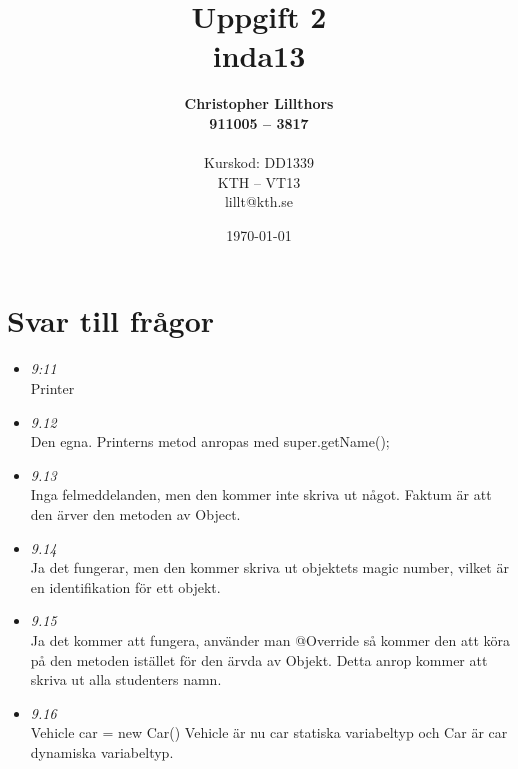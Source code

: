 \documentclass[a4paper,11pt]{article}
\title{Uppgift 2 \\ inda13}
\author{
  {\bf Christopher Lillthors}\\
  \textbf{911005 -- 3817} \\
  \\ 
  Kurskod: DD1339\\
  KTH -- VT13\\
  lillt@kth.se\\
}
\date{\today}
\begin{document}
\maketitle

\renewcommand{\arraystretch}{1.2}
\newpage

\section{Svar till frågor}
\begin{itemize}
\item \textit{9:11}
\\
Printer
\\
\item \textit{9.12}
\\
Den egna. Printerns metod anropas med super.getName();
\\
\item \textit{9.13}
\\
Inga felmeddelanden, men den kommer inte skriva ut något. Faktum är att den ärver den metoden av Object.
\item \textit{9.14}
\\
Ja det fungerar, men den kommer skriva ut objektets magic number, vilket är en identifikation för ett objekt.
\item \textit{9.15}
\\
Ja det kommer att fungera, använder man @Override så kommer den att köra på den metoden istället för den ärvda av Objekt. Detta anrop kommer att skriva ut alla studenters namn.
\item \textit{9.16}
\\
Vehicle car = new Car()
Vehicle är nu car statiska variabeltyp och Car är car dynamiska variabeltyp.
\end{itemize}
\end{document}
